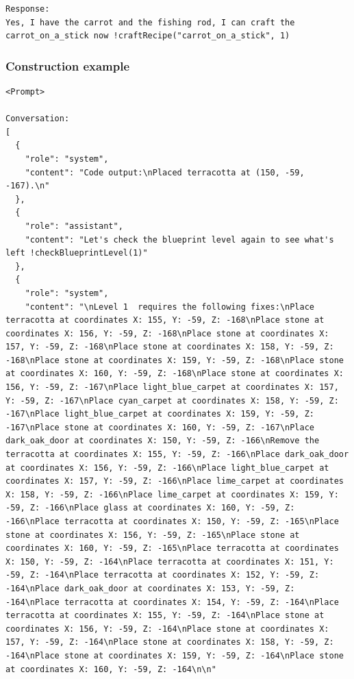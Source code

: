 \documentclass{article}
\begin{document}
\begin{lstlisting}
Response:
Yes, I have the carrot and the fishing rod, I can craft the carrot_on_a_stick now !craftRecipe("carrot_on_a_stick", 1)
\end{lstlisting}


\subsubsection{Construction example}

\begin{lstlisting}
<Prompt> 

Conversation:
[
  {
    "role": "system",
    "content": "Code output:\nPlaced terracotta at (150, -59, -167).\n"
  },
  {
    "role": "assistant",
    "content": "Let's check the blueprint level again to see what's left !checkBlueprintLevel(1)"
  },
  {
    "role": "system",
    "content": "\nLevel 1  requires the following fixes:\nPlace terracotta at coordinates X: 155, Y: -59, Z: -168\nPlace stone at coordinates X: 156, Y: -59, Z: -168\nPlace stone at coordinates X: 157, Y: -59, Z: -168\nPlace stone at coordinates X: 158, Y: -59, Z: -168\nPlace stone at coordinates X: 159, Y: -59, Z: -168\nPlace stone at coordinates X: 160, Y: -59, Z: -168\nPlace stone at coordinates X: 156, Y: -59, Z: -167\nPlace light_blue_carpet at coordinates X: 157, Y: -59, Z: -167\nPlace cyan_carpet at coordinates X: 158, Y: -59, Z: -167\nPlace light_blue_carpet at coordinates X: 159, Y: -59, Z: -167\nPlace stone at coordinates X: 160, Y: -59, Z: -167\nPlace dark_oak_door at coordinates X: 150, Y: -59, Z: -166\nRemove the terracotta at coordinates X: 155, Y: -59, Z: -166\nPlace dark_oak_door at coordinates X: 156, Y: -59, Z: -166\nPlace light_blue_carpet at coordinates X: 157, Y: -59, Z: -166\nPlace lime_carpet at coordinates X: 158, Y: -59, Z: -166\nPlace lime_carpet at coordinates X: 159, Y: -59, Z: -166\nPlace glass at coordinates X: 160, Y: -59, Z: -166\nPlace terracotta at coordinates X: 150, Y: -59, Z: -165\nPlace stone at coordinates X: 156, Y: -59, Z: -165\nPlace stone at coordinates X: 160, Y: -59, Z: -165\nPlace terracotta at coordinates X: 150, Y: -59, Z: -164\nPlace terracotta at coordinates X: 151, Y: -59, Z: -164\nPlace terracotta at coordinates X: 152, Y: -59, Z: -164\nPlace dark_oak_door at coordinates X: 153, Y: -59, Z: -164\nPlace terracotta at coordinates X: 154, Y: -59, Z: -164\nPlace terracotta at coordinates X: 155, Y: -59, Z: -164\nPlace stone at coordinates X: 156, Y: -59, Z: -164\nPlace stone at coordinates X: 157, Y: -59, Z: -164\nPlace stone at coordinates X: 158, Y: -59, Z: -164\nPlace stone at coordinates X: 159, Y: -59, Z: -164\nPlace stone at coordinates X: 160, Y: -59, Z: -164\n\n"

\end{lstlisting}
\end{document}
